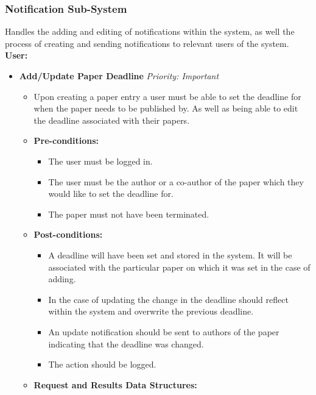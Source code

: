 \documentclass{article}
\begin{document}
			\subsubsection{Notification Sub-System}\label{subsubsec:notification}
				Handles the adding and editing of notifications within the system, as well the process of creating and sending notifications to relevant users of the system.\\
				[3mm]
				\textbf{User:}
				\begin{itemize}
					\item \textbf{Add/Update Paper Deadline} \hfill \textit{Priority: Important}
					\begin{itemize}
						\item Upon creating a paper entry a user must be able to set the deadline for when the paper needs to be published by. As well as being able to edit the deadline associated with their papers.
						\item \textbf{Pre-conditions:}
						\begin{itemize}
							\item The user must be logged in.
							\item The user must be the author or a co-author of the paper which they would like to set the deadline for.
							\item The paper must not have been terminated.
						\end{itemize}
						\item \textbf{Post-conditions:}
						\begin{itemize}
							\item A deadline will have been set and stored in the system. It will be associated with the particular paper on which it was set in the case of adding.
							\item In the case of updating the change in the deadline should reflect within the system and overwrite the previous deadline.
							\item An update notification should be sent to authors of the paper indicating that the deadline was changed.
							\item The action should be logged.
						\end{itemize}
						\item \textbf{Request and Results Data Structures:}
					\end{itemize}	
					

\end{itemize}
\end{document}
